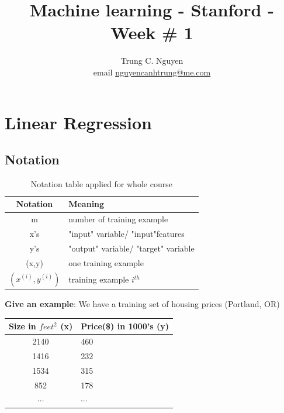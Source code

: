 \documentclass[a4paper, 10pt]{article}
\title{Machine learning - Stanford - Week \# 1 }
\author{Trung C. Nguyen 
	\\ email \href{mailto:nguyencanhtrung@me.com}{nguyencanhtrung@me.com} }
\begin{document}
	\maketitle
	\tableofcontents
	
	\newpage
	\clearpage
	
\section{Linear Regression}
\subsection{Notation}
\begin{table}[htb]
	\begin{center}
		\begin{tabular}[h]{ c | l }
			
			\textbf{Notation}    & \textbf{Meaning}\\ \midrule
			m 			 			 	 & number of training example \\ 
			x's    		 				 & "input" variable/ "input"features \\
			y's  		 				 & "output" variable/ "target" variable \\
			(x,y) 						& one training example \\
			$(x^{(i)}, y^{(i)})$    & training example $i^{th}$ \\
			
		\end{tabular}
		\caption{Notation table applied for whole course} \label{tab.notation}
	\end{center}
\end{table}
\vspace*{1mm}
\textbf{Give an example}:
We have a training set of housing prices (Portland, OR)
\begin{table}[htb]
	\begin{center}
		\begin{tabular}[h]{ c | l }	
			\textbf{Size in $feet^2$ (x)}    & \textbf{Price(\$) in 1000's (y)}\\ \midrule
			2140 			 			 	 & 460 \\ 
			1416   		 				 & 232 \\
			1534  		 				 & 315 \\
			852 						& 178 \\
			$ \cdots $   & $\cdots$\\	
		\end{tabular}
	\end{center}
\end{table}
\end{document}
